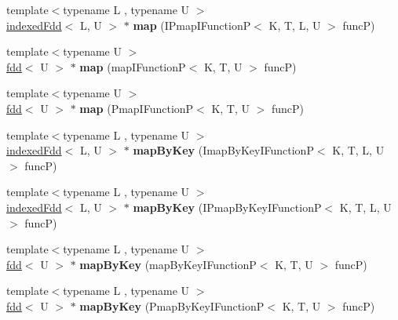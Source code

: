 \begin{DoxyCompactItemize}
{\footnotesize template$<$typename L , typename U $>$ }\\\hyperlink{classfaster_1_1indexedFdd}{indexed\+Fdd}$<$ L, U $>$ $\ast$ {\bfseries map} (I\+Pmap\+I\+FunctionP$<$ K, T, L, U $>$ funcP)
\item 
\hypertarget{classfaster_1_1indexedFdd_a9f6dad86bb02ecef29cf051609b50e37}{}\label{classfaster_1_1indexedFdd_a9f6dad86bb02ecef29cf051609b50e37} 
{\footnotesize template$<$typename U $>$ }\\\hyperlink{classfaster_1_1fdd}{fdd}$<$ U $>$ $\ast$ {\bfseries map} (map\+I\+FunctionP$<$ K, T, U $>$ funcP)
\item 
\hypertarget{classfaster_1_1indexedFdd_a0c5c85eebcf016fdc39b7a52f1b965e1}{}\label{classfaster_1_1indexedFdd_a0c5c85eebcf016fdc39b7a52f1b965e1} 
{\footnotesize template$<$typename U $>$ }\\\hyperlink{classfaster_1_1fdd}{fdd}$<$ U $>$ $\ast$ {\bfseries map} (Pmap\+I\+FunctionP$<$ K, T, U $>$ funcP)
\item 
\hypertarget{classfaster_1_1indexedFdd_a72e66cd0a1896a9ba95e093ea665e5f9}{}\label{classfaster_1_1indexedFdd_a72e66cd0a1896a9ba95e093ea665e5f9} 
{\footnotesize template$<$typename L , typename U $>$ }\\\hyperlink{classfaster_1_1indexedFdd}{indexed\+Fdd}$<$ L, U $>$ $\ast$ {\bfseries map\+By\+Key} (Imap\+By\+Key\+I\+FunctionP$<$ K, T, L, U $>$ funcP)
\item 
\hypertarget{classfaster_1_1indexedFdd_ac1f7ce69086373cc5b419da1f8213bdd}{}\label{classfaster_1_1indexedFdd_ac1f7ce69086373cc5b419da1f8213bdd} 
{\footnotesize template$<$typename L , typename U $>$ }\\\hyperlink{classfaster_1_1indexedFdd}{indexed\+Fdd}$<$ L, U $>$ $\ast$ {\bfseries map\+By\+Key} (I\+Pmap\+By\+Key\+I\+FunctionP$<$ K, T, L, U $>$ funcP)
\item 
\hypertarget{classfaster_1_1indexedFdd_a993ec5033e2f665437f5d8590794fe0b}{}\label{classfaster_1_1indexedFdd_a993ec5033e2f665437f5d8590794fe0b} 
{\footnotesize template$<$typename L , typename U $>$ }\\\hyperlink{classfaster_1_1fdd}{fdd}$<$ U $>$ $\ast$ {\bfseries map\+By\+Key} (map\+By\+Key\+I\+FunctionP$<$ K, T, U $>$ funcP)
\item 
\hypertarget{classfaster_1_1indexedFdd_a558fd453f0a2ba00515359a46690972d}{}\label{classfaster_1_1indexedFdd_a558fd453f0a2ba00515359a46690972d} 
{\footnotesize template$<$typename L , typename U $>$ }\\\hyperlink{classfaster_1_1fdd}{fdd}$<$ U $>$ $\ast$ {\bfseries map\+By\+Key} (Pmap\+By\+Key\+I\+FunctionP$<$ K, T, U $>$ funcP)

\end{DoxyCompactItemize}
